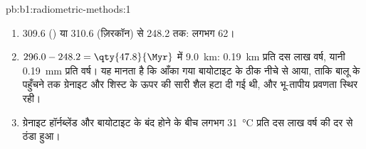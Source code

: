 \begin{solution}{pb:b1:radiometric-methods:1}
\begin{enumerate}
  \item \qty{309.6}{\Ma} () या \qty{310.6}{\Ma} (ज़िरकॉन) से \qty{248.2}{\Ma} तक: लगभग \qty{62}{\Myr}।
  \item $296.0 - 248.2 = \qty{47.8}{\Myr}$ में \qty{9.0}{km}: \qty{0.19}{km} प्रति दस लाख वर्ष, यानी \qty{0.19}{mm} प्रति वर्ष। यह मानता है कि आँका गया बायोटाइट  के ठीक नीचे से आया, ताकि बालू के पहुँचने तक ग्रेनाइट और शिस्ट के ऊपर की सारी शैल हटा दी गई थी, और भू-तापीय प्रवणता स्थिर रही।
  \item ग्रेनाइट हॉर्नब्लेंड और बायोटाइट के बंद होने के बीच लगभग \qty{31}{\celsius} प्रति दस लाख वर्ष की दर से ठंडा हुआ।
\end{enumerate}
\end{solution}
